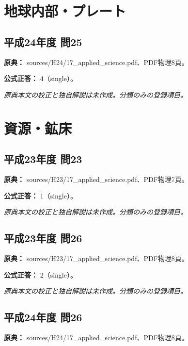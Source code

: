 \section{地球内部・プレート}

\subsection{平成24年度 問25}
\label{q:h24-reg-applied-25}

\noindent\textbf{原典：} sources/H24/17\_applied\_science.pdf、PDF物理8頁。

\textbf{公式正答：} 4（single）。

\par\textit{原典本文の校正と独自解説は未作成。分類のみの登録項目。}

\section{資源・鉱床}

\subsection{平成23年度 問23}
\label{q:h23-reg-applied-23}

\noindent\textbf{原典：} sources/H23/17\_applied\_science.pdf、PDF物理7頁。

\textbf{公式正答：} 1（single）。

\par\textit{原典本文の校正と独自解説は未作成。分類のみの登録項目。}

\subsection{平成23年度 問26}
\label{q:h23-reg-applied-26}

\noindent\textbf{原典：} sources/H23/17\_applied\_science.pdf、PDF物理8頁。

\textbf{公式正答：} 2（single）。

\par\textit{原典本文の校正と独自解説は未作成。分類のみの登録項目。}

\subsection{平成24年度 問26}
\label{q:h24-reg-applied-26}

\noindent\textbf{原典：} sources/H24/17\_applied\_science.pdf、PDF物理8頁。

